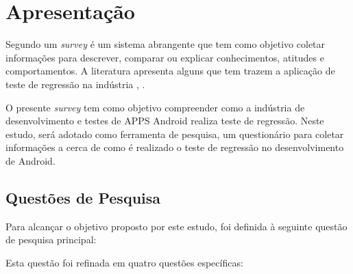\acresetall 

\section{Apresentação}

Segundo \cite{PSK2001} um \textit{survey} é um sistema abrangente que tem como objetivo coletar informações para descrever, comparar ou explicar conhecimentos, atitudes e comportamentos. A literatura apresenta alguns que tem trazem a aplicação de teste de regressão na indústria \cite{Ali2019}, \cite{630875}.


O presente \textit{survey} tem como objetivo compreender como a indústria de desenvolvimento e testes de \ac{APPS} Android realiza teste de regressão. Neste estudo, será adotado como ferramenta de pesquisa, um questionário para coletar informações a cerca de como é realizado o teste de regressão no desenvolvimento de  Android.

\subsection{Questões de Pesquisa}
Para alcançar o objetivo proposto por este estudo, foi definida à seguinte questão de pesquisa principal:
\leavevspace 

\begin{center}
    \noindent{}
\end{center}

\vspace{.5em}

Esta questão foi refinada em quatro questões específicas:
\vspace{.5em}


